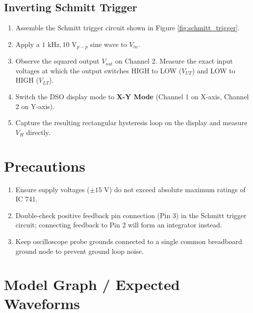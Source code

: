 \subsection{Inverting Schmitt Trigger}
\begin{enumerate}
\item Assemble the Schmitt trigger circuit shown in Figure \ref{fig:schmitt_trigger}.
\item Apply a $1\text{ kHz}, 10\text{ V}_{p-p}$ sine wave to $V_{in}$.
\item Observe the squared output $V_{out}$ on Channel 2. Measure the exact input voltages at which the output switches HIGH to LOW ($V_{UT}$) and LOW to HIGH ($V_{LT}$).
\item Switch the DSO display mode to \textbf{X-Y Mode} (Channel 1 on X-axis, Channel 2 on Y-axis).
\item Capture the resulting rectangular hysteresis loop on the display and measure $V_H$ directly.
\end{enumerate}

\section{Precautions}
\begin{enumerate}
\item  Ensure supply voltages ($\pm 15\text{ V}$) do not exceed absolute maximum ratings of IC 741.
\item Double-check positive feedback pin connection (Pin 3) in the Schmitt trigger circuit; connecting feedback to Pin 2 will form an integrator instead.
\item Keep oscilloscope probe grounds connected to a single common breadboard ground node to prevent ground loop noise.
\end{enumerate}

\section{Model Graph / Expected Waveforms}

